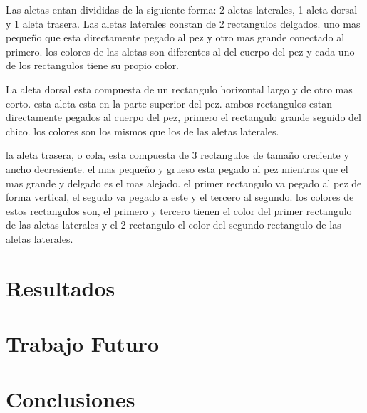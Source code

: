 \documentclass[10pt, a4paper, twocolumn]{article}
\begin{document}
Las aletas entan divididas de la siguiente forma: 2 aletas laterales, 1 aleta dorsal y 1 aleta trasera. Las aletas laterales constan de 2 rectangulos delgados. uno mas pequeño que esta directamente pegado al pez y otro mas grande conectado al primero. los colores de las aletas son diferentes al del cuerpo del pez y cada uno de los rectangulos tiene su propio color.

La aleta dorsal esta compuesta de un rectangulo horizontal largo y de otro mas corto. esta aleta esta en la parte superior del pez. ambos rectangulos estan directamente pegados al cuerpo del pez, primero el rectangulo grande seguido del chico. los colores son los mismos que los de las aletas laterales. 

la aleta trasera, o cola, esta compuesta de 3 rectangulos de tamaño creciente y ancho decresiente. el mas pequeño y grueso esta pegado al pez mientras que el mas grande y delgado es el mas alejado. el primer rectangulo va pegado al pez de forma vertical, el segudo va pegado a este y el tercero al segundo. los colores de estos rectangulos son, el primero y tercero tienen el color del primer rectangulo de las aletas laterales y el 2 rectangulo el color del segundo rectangulo de las aletas laterales.



\section{Resultados}

\section{Trabajo Futuro}

\section{Conclusiones}

\printbibliography[{title = "example.bib" }] %

\end{document}
